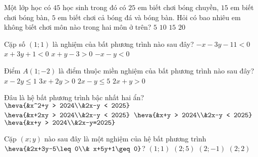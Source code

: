 \begin{ex}%
	Một lớp học có $ 45 $ học sinh trong đó có $ 25 $ em biết chơi bóng chuyền, $ 15 $ em biết chơi bóng bàn, $ 5 $ em biết chơi cả bóng đá và bóng bàn. Hỏi có bao nhiêu em không biết chơi môn nào trong hai môn ở trên?
	\choice
	{$5$}
	{\True $10$}
	{$15$}
	{$20$}
\end{ex}

\begin{ex}%
	Cặp số $(1;1)$ là nghiệm của bất phương trình nào sau đây?
	\choice
	{$-x-3y-11<0$}
	{$x+3y+1<0$}
	{$x+y-3>0$}
	{\True $-x-y<0$}
\end{ex}

\begin{ex}%
	Điểm $A(1 ;-2)$ là điểm thuộc miền nghiệm của bất phương trình nào sau đây?
	\choice
	{$x-2y \leq 1$}
	{$3x+2y>0$}
	{\True $2x-y \leq 5$}
	{$2x+y>0$}
\end{ex}

\begin{ex}%
	Đâu là hệ bất phương trình bậc nhất hai ẩn?
	\choice
	{$\heva{&x^2+y > 2024\\&2x-y < 2025}$}
	{$\heva{&x+2xy > 2024\\&2x-y < 2025}$}
	{\True $\heva{&x+y > 2024\\&2x-y < 2025}$}
	{$\heva{&x+y > 2024\\&2x-y=2025}$}
\end{ex}

\begin{ex}%
	Cặp $(x; y)$ nào sau đây là một nghiệm của hệ bất phương trình $\heva{&2x+3y-5\leq 0\\& x+5y+1\geq 0}$?
	\choice
	{\True $(1;1)$}
	{$(2;5)$}
	{$(2;-1)$}
	{$(2; 2)$}
\end{ex}

